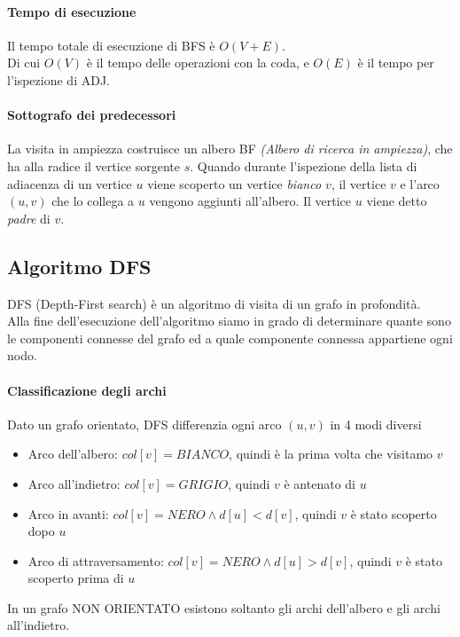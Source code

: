 \documentclass[12pt, a4paper, openany]{book}
\begin{document}
\paragraph*{Tempo di esecuzione}
Il tempo totale di esecuzione di BFS è $O(V + E)$.\\
Di cui $O(V)$ è il tempo delle operazioni con la coda, e $O(E)$ è il tempo per l'ispezione di ADJ.

\paragraph{Sottografo dei predecessori}
La visita in ampiezza costruisce un albero BF \emph{(Albero di ricerca in ampiezza)}, che ha alla radice il vertice sorgente $s$.
Quando durante l'ispezione della lista di adiacenza di un vertice $u$ viene scoperto un vertice \emph{ bianco $v$},
il vertice $v$ e l'arco $(u,v)$ che lo collega a $u$ vengono aggiunti all'albero.
Il vertice $u$ viene detto \emph{padre} di $v$.



\subsection{Algoritmo DFS}
DFS (Depth-First search) è un algoritmo di visita di un grafo in profondità.
\\Alla fine dell'esecuzione dell'algoritmo siamo in grado di determinare quante sono le componenti connesse
del grafo ed a quale componente connessa appartiene ogni nodo.

\paragraph{Classificazione degli archi}
Dato un grafo orientato, DFS differenzia ogni arco $(u,v)$ in 4 modi diversi
\begin{itemize}
	\item Arco dell'albero: $col[v] = BIANCO$, quindi è la prima volta che visitamo $v$
	\item Arco all'indietro: $col[v] = GRIGIO$, quindi $v$ è antenato di $u$
	\item Arco in avanti: $col[v] = NERO \land d[u] < d[v]$, quindi $v$ è stato scoperto dopo $u$
	\item Arco di attraversamento: $col[v] = NERO \land d[u] > d[v]$, quindi $v$ è stato scoperto prima di $u$
\end{itemize}
In un grafo NON ORIENTATO esistono soltanto gli archi dell'albero e gli archi all'indietro.
\end{document}
